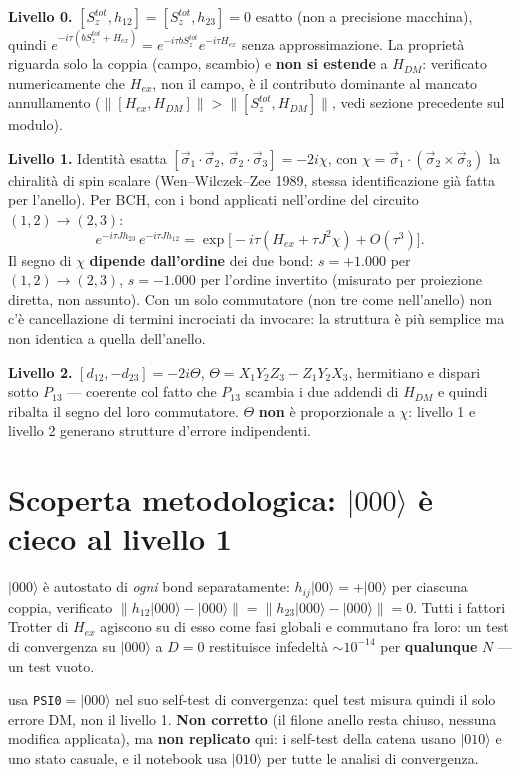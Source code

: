 \documentclass[11pt,a4paper]{article}
\newcommand{\ket}[1]{\lvert #1 \rangle}
\begin{document}
\textbf{Livello 0.} $[S_z^{tot},h_{12}]=[S_z^{tot},h_{23}]=0$ esatto (non a
precisione macchina), quindi
$e^{-i\tau(bS_z^{tot}+H_{ex})}=e^{-i\tau bS_z^{tot}}e^{-i\tau H_{ex}}$ senza
approssimazione. La proprietà riguarda solo la coppia (campo, scambio) e
\textbf{non si estende} a $H_{DM}$: verificato numericamente che $H_{ex}$, non il
campo, è il contributo dominante al mancato annullamento
($\|[H_{ex},H_{DM}]\|>\|[S_z^{tot},H_{DM}]\|$, vedi sezione precedente sul modulo).

\textbf{Livello 1.} Identità esatta $[\vec\sigma_1\!\cdot\!\vec\sigma_2,\,
\vec\sigma_2\!\cdot\!\vec\sigma_3]=-2i\chi$, con $\chi=\vec\sigma_1\cdot(\vec\sigma_2
\times\vec\sigma_3)$ la chiralità di spin scalare (Wen--Wilczek--Zee 1989, stessa
identificazione già fatta per l'anello). Per BCH, con i bond applicati nell'ordine
del circuito $(1,2)\to(2,3)$:
\[
e^{-i\tau Jh_{23}}\,e^{-i\tau Jh_{12}} = \exp\!\big[-i\tau(H_{ex}+\tau J^2\chi)+O(\tau^3)\big].
\]
Il segno di $\chi$ \textbf{dipende dall'ordine} dei due bond: $s{=}{+}1.000$ per
$(1,2)\to(2,3)$, $s{=}{-}1.000$ per l'ordine invertito (misurato per proiezione
diretta, non assunto). Con un solo commutatore (non tre come nell'anello) non c'è
cancellazione di termini incrociati da invocare: la struttura è più semplice ma
non identica a quella dell'anello.

\textbf{Livello 2.} $[d_{12},-d_{23}]=-2i\Theta$, $\Theta=X_1Y_2Z_3-Z_1Y_2X_3$,
hermitiano e dispari sotto $P_{13}$ — coerente col fatto che $P_{13}$ scambia i due
addendi di $H_{DM}$ e quindi ribalta il segno del loro commutatore. $\Theta$
\textbf{non} è proporzionale a $\chi$: livello 1 e livello 2 generano strutture
d'errore indipendenti.

\section*{Scoperta metodologica: $\ket{000}$ è cieco al livello 1}

$\ket{000}$ è autostato di \emph{ogni} bond separatamente: $h_{ij}\ket{00}=+\ket{00}$
per ciascuna coppia, verificato $\|h_{12}\ket{000}-\ket{000}\|=\|h_{23}\ket{000}-
\ket{000}\|=0$. Tutti i fattori Trotter di $H_{ex}$ agiscono su di esso come fasi
globali e commutano fra loro: un test di convergenza su $\ket{000}$ a $D{=}0$
restituisce infedeltà $\sim10^{-14}$ per \textbf{qualunque} $N$ — un test vuoto.

\texttt{} usa \texttt{PSI0}$=\ket{000}$ nel suo
self-test di convergenza: quel test misura quindi il solo errore DM, non il livello
1. \textbf{Non corretto} (il filone anello resta chiuso, nessuna modifica
applicata), ma \textbf{non replicato} qui: i self-test della catena usano
$\ket{010}$ e uno stato casuale, e il notebook usa $\ket{010}$ per tutte le analisi
di convergenza.
\end{document}
